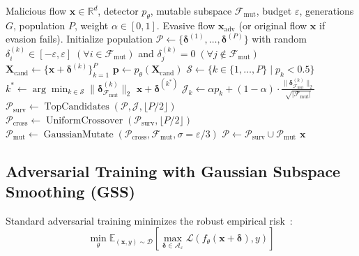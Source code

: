 \documentclass[final,5p,times,twocolumn]{elsarticle}
\begin{document}
\begin{algorithm}[htbp]
\caption{Feature-Constrained Multi-Objective Evolutionary Evasion (FCEE)}
\label{alg:ga}
\footnotesize
\begin{algorithmic}[1]
\Require Malicious flow $\mathbf{x} \in \mathbb{R}^d$, detector $p_\theta$, mutable subspace $\mathcal{F}_{\text{mut}}$, budget $\varepsilon$, generations $G$, population $P$, weight $\alpha \in [0, 1]$.
\Ensure Evasive flow $\mathbf{x}_{\text{adv}}$ (or original flow $\mathbf{x}$ if evasion fails).
\State Initialize population $\mathcal{P} \leftarrow \{\boldsymbol{\delta}^{(1)}, \dots, \boldsymbol{\delta}^{(P)}\}$ with random $\delta^{(k)}_i \in [-\varepsilon, \varepsilon] \; (\forall i \in \mathcal{F}_{\text{mut}})$ and $\delta^{(k)}_j = 0 \; (\forall j \notin \mathcal{F}_{\text{mut}})$
    \State $\mathbf{X}_{\text{cand}} \leftarrow \{\mathbf{x} + \boldsymbol{\delta}^{(k)}\}_{k=1}^P$
    \State $\mathbf{p} \leftarrow p_\theta(\mathbf{X}_{\text{cand}})$
    \State $\mathcal{S} \leftarrow \{k \in \{1, \dots, P\} \mid p_k < 0.5\}$
        \State $k^* \leftarrow \arg\min_{k \in \mathcal{S}} \|\boldsymbol{\delta}^{(k)}_{\mathcal{F}_{\text{mut}}}\|_2$
        \State \Return $\mathbf{x} + \boldsymbol{\delta}^{(k^*)}$
    \EndIf
        \State $\mathcal{J}_k \leftarrow \alpha p_k + (1-\alpha) \cdot \frac{\|\boldsymbol{\delta}^{(k)}_{\mathcal{F}_{\text{mut}}}\|_2}{\sqrt{|\mathcal{F}_{\text{mut}}|}}$
    \EndFor
    \State $\mathcal{P}_{\text{surv}} \leftarrow \operatorname{TopCandidates}(\mathcal{P}, \boldsymbol{\mathcal{J}}, \lfloor P/2 \rfloor)$
    \State $\mathcal{P}_{\text{cross}} \leftarrow \operatorname{UniformCrossover}(\mathcal{P}_{\text{surv}}, \lfloor P/2 \rfloor)$
    \State $\mathcal{P}_{\text{mut}} \leftarrow \operatorname{GaussianMutate}(\mathcal{P}_{\text{cross}}, \mathcal{F}_{\text{mut}}, \sigma = \varepsilon/3)$
    \State $\mathcal{P} \leftarrow \mathcal{P}_{\text{surv}} \cup \mathcal{P}_{\text{mut}}$
\EndFor
\State \Return $\mathbf{x}$
\end{algorithmic}
\end{algorithm}

\subsection{Adversarial Training with Gaussian Subspace Smoothing (GSS)}
\label{sec:gss}
Standard adversarial training minimizes the robust empirical risk~\cite{madry2018towards}:
\begin{equation}
    \min_\theta \mathbb{E}_{(\mathbf{x}, y) \sim \mathcal{D}} \left[ \max_{\boldsymbol{\delta} \in \mathcal{A}_\varepsilon} \mathcal{L}(f_\theta(\mathbf{x} + \boldsymbol{\delta}), y) \right]
\end{equation}
\end{document}
